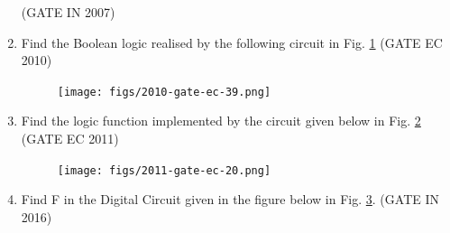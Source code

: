 \begin{enumerate}
\hfill (GATE IN 2007)
\item 
\label{prob:2010-gate-ec-39}
Find the Boolean logic realised by the following circuit in Fig.
\ref{fig:2010-gate-ec-39}
\hfill (GATE EC 2010)
\begin{figure}[!ht]
\centering
	\texttt{[image: figs/2010-gate-ec-39.png]}
\caption{}
\label{fig:2010-gate-ec-39}
\end{figure}
\item 
\label{prob:2011-gate-ec-20}
Find the logic function implemented by the circuit given below 
in Fig.
\ref{fig:2011-gate-ec-20}
\hfill (GATE EC 2011)
\begin{figure}[!ht]
\centering
	\texttt{[image: figs/2011-gate-ec-20.png]}
\caption{}
\label{fig:2011-gate-ec-20}
\end{figure}
\item
\label{prob:2016/gate/in/19}
Find F in the Digital Circuit given in the figure below
in Fig. \ref{fig:2016/gate/in/19}.
\hfill (GATE IN 2016)
\begin{figure}[!ht]
	\centering
{}
	\caption{}
\label{fig:2016/gate/in/19}
\end{figure}



\end{enumerate}
